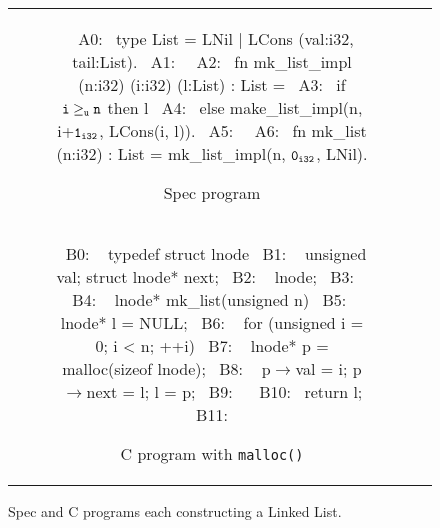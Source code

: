 \begin{figure}
\begin{tabular}{@{}c@{}c@{}}
\begin{subfigure}[b]{\textwidth}
\begin{center}
\begin{allLangEnvFoot}
~{\scriptsize \textcolor{mygray}{A0:}}~ type List = LNil | LCons (val:i32, tail:List).
~{\scriptsize \textcolor{mygray}{A1:}}~
~{\scriptsize \textcolor{mygray}{A2:}}~ fn mk_list_impl (n:i32) (i:i32) (l:List) : List =
~{\scriptsize \textcolor{mygray}{A3:}}~    if ${\tt i \geq_u n}$ then l
~{\scriptsize \textcolor{mygray}{A4:}}~             else make_list_impl(n, i+${\tt 1_{i32}}$, LCons(i, l)).
~{\scriptsize \textcolor{mygray}{A5:}}~
~{\scriptsize \textcolor{mygray}{A6:}}~ fn mk_list (n:i32) : List = mk_list_impl(n, ${\tt 0_{i32}}$, LNil).
\end{allLangEnvFoot}
\end{center}
\caption{\label{fig:llAllocSpec}Spec program}
\end{subfigure}%
\\
\begin{subfigure}[b]{\textwidth}
\begin{center}
\begin{allLangEnvFoot}
~{\scriptsize \textcolor{mygray}{B0: }}~ typedef struct lnode {
~{\scriptsize \textcolor{mygray}{B1: }}~   unsigned val; struct lnode* next;
~{\scriptsize \textcolor{mygray}{B2: }}~ } lnode;
~{\scriptsize \textcolor{mygray}{B3: }}~ 
~{\scriptsize \textcolor{mygray}{B4: }}~ lnode* mk_list(unsigned n) {
~{\scriptsize \textcolor{mygray}{B5: }}~   lnode* l = NULL;
~{\scriptsize \textcolor{mygray}{B6: }}~   for (unsigned i = 0; i < n; ++i) {
~{\scriptsize \textcolor{mygray}{B7: }}~     lnode* p = malloc(sizeof lnode);
~{\scriptsize \textcolor{mygray}{B8: }}~     p$\rightarrow$val = i; p$\rightarrow$next = l; l = p;
~{\scriptsize \textcolor{mygray}{B9: }}~   }
~{\scriptsize \textcolor{mygray}{B10:}}~   return l;
~{\scriptsize \textcolor{mygray}{B11:}}~ }
\end{allLangEnvFoot}
\end{center}
\caption{\label{fig:llAllocC}C program with {\tt malloc()}}
\end{subfigure}%
\\
\end{tabular}
\caption{\label{fig:llAllocSpecAndC}Spec and C programs each constructing a Linked List.}
\end{figure}

